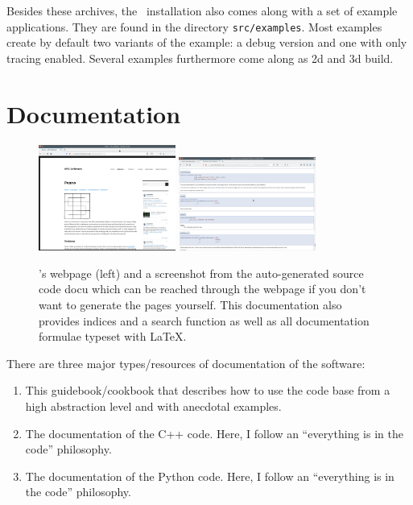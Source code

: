 \noindent
Besides these archives, the \Peano\ installation also comes along with a set of
example applications.
They are found in the directory \texttt{src/examples}.
Most examples create by default two variants of the example: a debug
version and one with only tracing enabled.
Several examples furthermore come along as 2d and 3d build.



\section{Documentation}

\begin{figure}
 \begin{center}
  \includegraphics[width=0.4\textwidth]{10_installation/webpage.png}
  \hspace{0.4cm}
  \includegraphics[width=0.4\textwidth]{10_installation/source-docu.png}
 \end{center}
 \caption{
  \Peano's webpage (left) and a screenshot from the auto-generated source code
  docu which can be reached through the webpage if you don't want to generate
  the pages yourself.
  This documentation also provides indices and a search function as well as all
  documentation formulae typeset with LaTeX.
 }
\end{figure}



There are three major types/resources of documentation of the software:
\begin{enumerate}
  \item This guidebook/cookbook that describes how to use the code base from a
  high abstraction level and with anecdotal examples.
  \item The documentation of the C++ code. Here, I follow an ``everything is in
  the code'' philosophy.
  \item The documentation of the Python code. Here, I follow an ``everything is
  in the code'' philosophy.
\end{enumerate}


